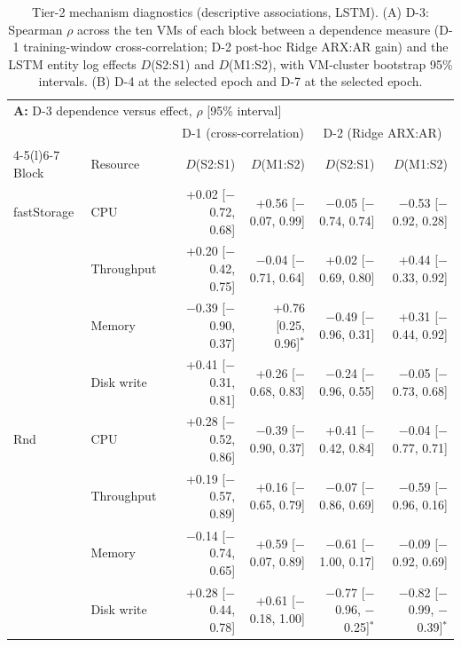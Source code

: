 
\begin{table}[t]
  \caption{Tier-2 mechanism diagnostics (descriptive associations, LSTM). (A) D-3: Spearman $\rho$ across the ten VMs of each block between a dependence measure (D-1 training-window cross-correlation; D-2 post-hoc Ridge ARX:AR gain) and the LSTM entity log effects $D$(S2:S1) and $D$(M1:S2), with VM-cluster bootstrap 95\% intervals. (B) D-4 at the selected epoch and D-7 at the selected epoch.}
  \label{tab:tier2-diagnostics}
  \centering
  \small
  \setlength{\tabcolsep}{3pt}
  \begin{tabular*}{\textwidth}{@{\extracolsep{\fill}}lllrrrr@{}}
    \toprule
    \multicolumn{7}{l}{\textbf{A:} D-3 dependence versus effect, $\rho$ [95\% interval]} \\
    & & & \multicolumn{2}{c}{D-1 (cross-correlation)} & \multicolumn{2}{c}{D-2 (Ridge ARX:AR)} \\
    \cmidrule(lr){4-5}\cmidrule(l){6-7}
    Block & Resource & & $D$(S2:S1) & $D$(M1:S2) & $D$(S2:S1) & $D$(M1:S2) \\
    \midrule
    fastStorage & CPU & & +0.02 [$-$0.72, 0.68] & +0.56 [$-$0.07, 0.99] & $-$0.05 [$-$0.74, 0.74] & $-$0.53 [$-$0.92, 0.28] \\
     & Throughput & & +0.20 [$-$0.42, 0.75] & $-$0.04 [$-$0.71, 0.64] & +0.02 [$-$0.69, 0.80] & +0.44 [$-$0.33, 0.92] \\
     & Memory & & $-$0.39 [$-$0.90, 0.37] & +0.76 [0.25, 0.96]$^{*}$ & $-$0.49 [$-$0.96, 0.31] & +0.31 [$-$0.44, 0.92] \\
     & Disk write & & +0.41 [$-$0.31, 0.81] & +0.26 [$-$0.68, 0.83] & $-$0.24 [$-$0.96, 0.55] & $-$0.05 [$-$0.73, 0.68] \\
    Rnd & CPU & & +0.28 [$-$0.52, 0.86] & $-$0.39 [$-$0.90, 0.37] & +0.41 [$-$0.42, 0.84] & $-$0.04 [$-$0.77, 0.71] \\
     & Throughput & & +0.19 [$-$0.57, 0.89] & +0.16 [$-$0.65, 0.79] & $-$0.07 [$-$0.86, 0.69] & $-$0.59 [$-$0.96, 0.16] \\
     & Memory & & $-$0.14 [$-$0.74, 0.65] & +0.59 [$-$0.07, 0.89] & $-$0.61 [$-$1.00, 0.17] & $-$0.09 [$-$0.92, 0.69] \\
     & Disk write & & +0.28 [$-$0.44, 0.78] & +0.61 [$-$0.18, 1.00] & $-$0.77 [$-$0.96, $-$0.25]$^{*}$ & $-$0.82 [$-$0.99, $-$0.39]$^{*}$ \\

\end{tabular*}
\end{table}
